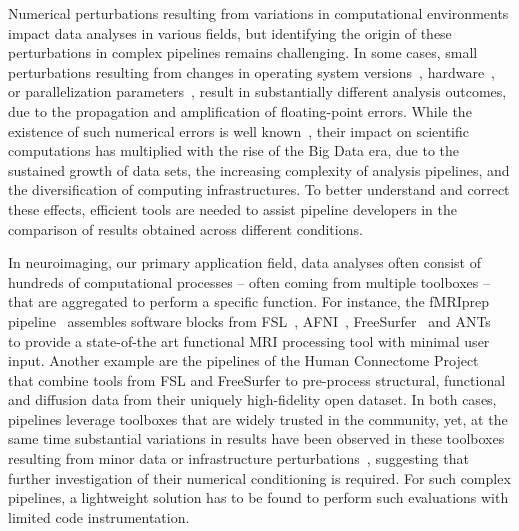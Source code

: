 Numerical perturbations resulting from variations in computational
environments impact data analyses in various fields, but identifying the
origin of these perturbations in complex pipelines remains challenging.  In
some cases, small perturbations resulting from changes in operating system
versions~\cite{Glatard2015}, hardware~\cite{jezequel2015estimation}, or
parallelization parameters~\cite{diethelm2011limits}, result in
substantially different analysis outcomes, due to the propagation
and amplification of floating-point errors. While the existence of such
numerical errors is well known~\cite{stoer2013introduction}, their impact
on scientific computations has multiplied with the rise of the Big Data
era, due to the sustained growth of data sets, the increasing complexity of
analysis pipelines, and the diversification of computing infrastructures.
To better understand and
correct these effects, efficient tools are
needed to assist pipeline developers
in the comparison of results obtained across different conditions.

In neuroimaging, our primary application field, data analyses often consist
of hundreds of computational processes -- often coming from multiple
toolboxes -- that are aggregated to perform a specific function. For
instance, the fMRIprep pipeline~\cite{esteban2019fmriprep} assembles software blocks
from FSL~\cite{jenkinson2012fsl}, AFNI~\cite{cox2012afni}, FreeSurfer~\cite{fischl2012freesurfer} and ANTs~\cite{avants2009advanced} to provide a state-of-the art
functional MRI processing tool with minimal user input. Another example are the pipelines of the Human
Connectome Project~\cite{glasser2013} that combine tools from FSL and FreeSurfer to pre-process
structural, functional and diffusion data from their
uniquely high-fidelity open dataset. In both cases, pipelines leverage toolboxes that are
widely trusted in the community, yet, at the same time substantial variations in results
have been observed in these toolboxes resulting from minor data
or infrastructure perturbations~\cite{Gronenschild2012,Glatard2015,Lindsay2017hbm,kennedy2019everything}, suggesting that further investigation of their
numerical conditioning is required. For such complex pipelines, a
lightweight solution has to be found to perform such evaluations with
limited code instrumentation.

